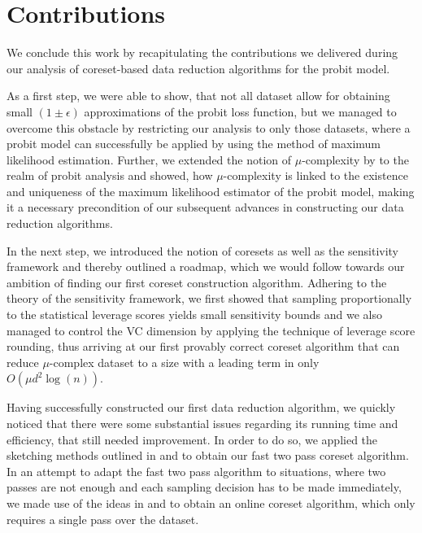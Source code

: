 \section{Contributions}

We conclude this work by recapitulating the contributions we delivered
during our analysis of coreset-based data reduction algorithms
for the probit model.

As a first step, we were able to show, that not all dataset allow
for obtaining small $(1 \pm \epsilon)$ approximations of the
probit loss function, but we
managed to overcome this obstacle by restricting our analysis to only
those datasets, where a probit model can successfully be applied
by using the method of maximum likelihood estimation.
Further, we extended the notion of $\mu$-complexity by
\cite{on-coresets} to the realm of probit analysis and showed, how
$\mu$-complexity is linked to the existence and uniqueness of the
maximum likelihood estimator of the probit model, making it a
necessary precondition of our subsequent advances in constructing our
data reduction algorithms.

In the next step, we introduced the notion of coresets as well as
the sensitivity framework and thereby outlined a roadmap, which we
would follow towards our ambition of finding our first coreset
construction algorithm.
Adhering to the theory of the sensitivity framework, we first
showed that sampling proportionally to the statistical leverage
scores yields small sensitivity bounds and we also managed to
control the VC dimension by applying the technique of leverage
score rounding, thus arriving at our first provably correct
coreset algorithm that can reduce $\mu$-complex dataset to
a size with a leading term in only $O(\mu d^2 \log(n))$.

Having successfully constructed our first data reduction algorithm,
we quickly noticed that there were some substantial issues regarding
its running time and efficiency,
that still needed improvement. In order to do so, we applied the sketching
methods outlined in \cite{leverage-scores-drineas} and
\cite{woodruff-2017} to obtain our fast two pass coreset algorithm.
In an attempt to adapt the fast two pass algorithm to situations,
where two passes are not enough and each sampling decision has to
be made immediately, we made use of the ideas in
\cite{online-row-sampling} and \cite{tensor-factorization}
to obtain an online coreset algorithm, which only requires a single
pass over the dataset.

